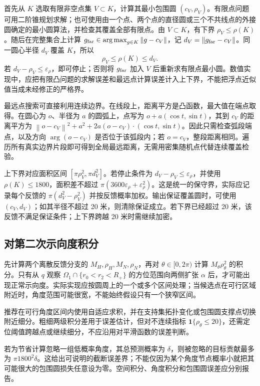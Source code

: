 \documentclass[UTF8,a4paper,zihao=-4,fontset=none]{ctexart}
\numberwithin{equation}{section}
\theoremstyle{definition}
\newcommand{\ind}{\mathbf 1}
\newcommand{\norm}[1]{\left\lVert #1\right\rVert}
\newcommand{\argmax}{\operatorname*{arg\,max}}
\begin{document}
首先从 \(K\) 选取有限非空点集 \(V\subset K\)，计算其最小包围圆 \((c_V,\rho_V)\)。有限点问题可用二阶锥规划求解；也可使用由一个点、两个点的直径圆或三个不共线点的外接圆确定的最小圆算法，并检查其覆盖全部有限点。由 \(V\subset K\)，有下界 \(\rho_V\le\rho(K)\)。随后在完整集合上计算 \(g_{\rm far}\in\argmax_{g\in K}\norm{g-c_V}\)，记 \(d_V=\norm{g_{\rm far}-c_V}\)。同一圆心半径 \(d_V\) 覆盖 \(K\)，所以
\begin{equation}\label{eq:mecbounds}
\rho_V\le\rho(K)\le d_V.
\end{equation}
若 \(d_V-\rho_V\le\varepsilon_\rho\)，即可停止；否则将 \(g_{\rm far}\) 加入 \(V\) 后重新求有限点最小圆。数值实现中，应把有限凸问题的求解误差和最远点计算误差计入上下界，不能把浮点近似值当成未经修正的严格界。

最远点搜索可直接利用连续边界。在线段上，距离平方是凸函数，最大值在端点取得。在圆心为 \(o\)、半径为 \(a\) 的圆弧上，点写为 \(o+a(\cos t,\sin t)\)，其到 \(c_V\) 的距离平方为 \(\norm{o-c_V}^2+a^2+2a(o-c_V)\cdot(\cos t,\sin t)\)。因此只需检查弧段端点，以及方向 \(\arg(o-c_V)\) 是否位于该弧段内；若 \(o=c_V\)，整段距离相同。遍历所有真实边界片段即可得到全局最远距离，无需用密集随机点代替连续覆盖检验。

上下界对应面积区间 \([\pi\rho_V^2,\pi d_V^2]\)。若停止条件为 \(d_V-\rho_V\le\varepsilon_\rho\)，并使用 \(\rho(K)\le1800\)，面积差不超过 \(\pi(3600\varepsilon_\rho+\varepsilon_\rho^2)\)。这是统一的保守界，实际应记录每个反馈的 \(\pi(d_V^2-\rho_V^2)\) 并按反馈概率加权。输出保证覆盖圆时，可使用 \((c_V,d_V)\)；如其半径不超过 20 米，则清除保证成立。若下界已经超过 20 米，该反馈不满足保证条件；上下界跨越 20 米时需继续加密。

\subsection{对第二次示向度积分}
先计算两个离散反馈分支的 \(M_H,\rho_H,M_N,\rho_N\)，再对 \(\theta\in[0,2\pi)\) 计算 \(M_\theta\rho_\theta^2\) 的积分。只有从 \(q\) 观察 \(\Omega_1\cap\{r_0<r_2<R_+\}\) 的方位范围向两侧扩张 \(\alpha\) 后，才可能出现正常示向度。实际实现应按圆周上的一个或多个区间处理；当候选点在可行区域附近时，角度范围可能很宽，不能始终假设只有一个狭窄区间。

推荐在可行角度区间内使用自适应求积，并在支持集拓扑变化或包围圆支撑点切换附近细分。粗细两级积分差用于误差估计，但对不连续指标 \(\ind\{\rho_\theta\le20\}\)，还需定位阈值跨越点或继续细分，不应沿用对平滑函数的误差判断。

若为节省计算忽略一组低概率角度，其总预测概率为 \(\delta\)，则被忽略的目标贡献最多为 \(\pi1800^2\delta\)。这给出可说明的截断误差界；不能仅因为某个角度节点概率小就把其可能很大的包围圆损失任意设为零。空间积分、角度积分和包围圆误差应分别报告。
\end{document}
